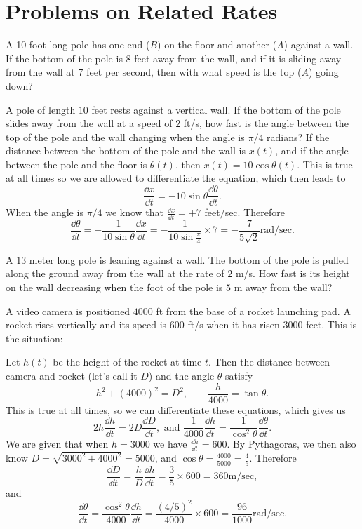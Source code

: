 \section{Problems on Related Rates}
\problemfont
\begin{multicols}{2}\setlength{\parindent}{0pt}
\problem A 10 foot long pole has one end ($B$) on the floor and another
($A$) against a wall.  If the bottom of the pole is 8 feet away from the
wall, and if it is sliding away from the wall at 7 feet per second, then
with what speed is the top ($A$) going down?




\problem A pole of length $10$ feet rests against a vertical wall.  If
the bottom of the pole slides away from the wall at a speed of $2$
ft/s, how fast is the angle between the top of the pole and the wall
changing when the angle is $\pi/4$ radians?
\answer
If the distance between the bottom of the pole and the wall is $x(t)$,
and if the angle between the pole and the floor is $\theta(t)$, then
$x(t) = 10 \cos \theta(t)$.  This is true at all times so we are
allowed to differentiate the equation, which then leads to
\[
\frac{\dd x} {\dd t} = -10\sin\theta \frac{\dd \theta} {\dd t}.
\]
When the angle is $\pi/4$ we know that $\frac{\dd x} {\dd t} = +7$ feet$/$sec.
Therefore
\[
\frac{\dd \theta} {\dd t}
= -\frac{1} {10\sin\theta} \frac{\dd x} {\dd t}
= -\frac{1} {10\sin\frac\pi4} \times 7
= - \frac{7} {5\surd 2} \mathrm{rad}/\mathrm{sec}.
\]
\endanswer

\problem A $13$ meter long pole is leaning against a wall.  The bottom
of the pole is pulled along the ground away from the wall at the rate
of $2$ m/s.  How fast is its height on the wall decreasing when the
foot of the pole is $5$ m away from the wall?


\problem \groupproblem A video camera is positioned $4000$ ft from the base
of a rocket launching pad.  A rocket rises vertically and its speed is
$600$ ft/s when it has risen $3000$ feet.
\answer
This is the situation:
\begin{center}
  
\end{center}
Let $h(t)$ be the height of the rocket at time $t$.  Then the distance between
camera and rocket (let's call it $D$) and the angle $\theta$ satisfy
\[
h^2+ (4000)^2 = D^2, \qquad
\frac{h} {4000} = \tan \theta.
\]
This is true at all times, so we can differentiate these equations, which gives us
\[
2h\frac{\dd h} {\dd t} = 2D\frac{\dd D} {\dd t},
\text{ and }
\frac{1} {4000}\frac{\dd h} {\dd t}
= \frac{1} {\cos^2\theta} \frac{\dd\theta} {\dd t}.
\]
We are given that when $h=3000$ we have $\frac{\dd h} {\dd t} = 600$.
By Pythagoras, we then also know $D=\sqrt{3000^2 + 4000^2} = 5000$,
and $\cos \theta = \frac{4000} {5000} = \frac{4} {5}$.
Therefore
\[
\frac{\dd D} {\dd t}
= \frac{h} {D}\frac{\dd h} {\dd t}
= \frac{3} {5}\times 600
= 360  \mathrm{m}/\mathrm{sec},
\]
and
\[
\frac{\dd \theta} {\dd t}
= \frac{\cos^2\theta} {4000} \frac{\dd h} {\dd t}
= \frac{(4/5)^2} {4000}\times600
= \frac{96} {1000}  \mathrm{rad}/\mathrm{sec}.
\]
\endanswer


\end{multicols}
